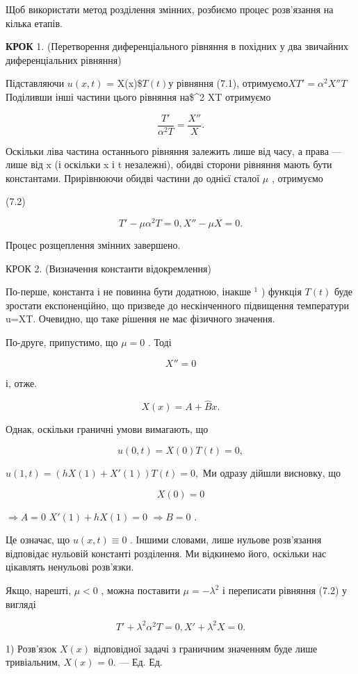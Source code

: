 \documentclass[
  ukrainian,
]{article}
\begin{document}
Щоб використати метод розділення змінних, розбиємо процес розв'язання на
кілька етапів.

\textbf{КРОК} 1. (Перетворення диференціального рівняння в похідних у
два звичайних диференціальних рівняння)

Підставляючи \(u(x, t)\) = X(x)\$\(T(t)\)у рівняння (7.1),
отримуємо\(XT' = \alpha^2 X''T\)Поділивши інші частини цього рівняння
на\$\alpha\^{}2 XT отримуємо

\[
\frac{T'}{\alpha^2 T} = \frac{X''}{X} .
\]

Оскільки ліва частина останнього рівняння залежить лише від часу, а
права --- лише від x (і оскільки x і t незалежні), обидві сторони
рівняння мають бути константами. Прирівнюючи обидві частини до однієї
сталої \(\mu\) , отримуємо

(7.2)

\[
T' - \mu \alpha^{2} T = 0, X'' - \mu X = 0.
\]

Процес розщеплення змінних завершено.

КРОК 2. (Визначення константи відокремлення)

По-перше, константа і не повинна бути додатною, інакше \(^{1}\) )
функція \(T\left( t\right)\) буде зростати експоненційно, що призведе до
нескінченного підвищення температури u=XT. Очевидно, що таке рішення не
має фізичного значення.

По-друге, припустимо, що \(\mu = 0\) . Тоді

\[
X'' = 0
\]

і, отже.

\[
X(x) = A + \hat{B}x.
\]

Однак, оскільки граничні умови вимагають, що

\[
u(0, t) = X(0) T(t) = 0,
\]

\(u(1, t) = (hX(1) + X'(1)) T(t) = 0,\) Ми одразу дійшли висновку, що

\[
X(0) = 0
\]

\(\Rightarrow A = 0\) \(X'(1) + hX(1) = 0\) \(\Rightarrow B = 0\) .

Це означає, що \(u(x, t) \equiv 0\) . Іншими словами, лише нульове
розв'язання відповідає нульовій константі розділення. Ми відкинемо його,
оскільки нас цікавлять ненульові розв'язки.

Якщо, нарешті, \(\mu < 0\) , можна поставити \(\mu = -\lambda^2\) і
переписати рівняння (7.2) у вигляді

\[
T' + \lambda^2 \alpha^2 T = 0,
X' + \lambda^2 X = 0.
\]

1) Розв'язок \(X(x)\) відповідної задачі з граничним значенням буде лише
тривіальним, \(X(x)\) = 0. --- Ед. Ед.
\end{document}

